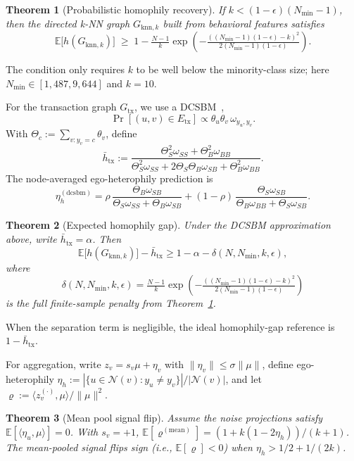 \documentclass[sigconf,natbib=true,anonymous=true]{acmart}
\newtheorem{theorem}{Theorem}
\theoremstyle{definition}
\begin{document}
\begin{theorem}[Probabilistic homophily recovery]
\label{thm:knn_homophily}
If $k < (1-\epsilon)(N_{\min}-1)$, then the directed k-NN graph $G_{\text{knn},k}$ built from behavioral features satisfies
\[
    \mathbb{E}\big[h(G_{\text{knn}, k})\big] \;\geq\; 1 - \tfrac{N - 1}{k} \exp\!\left(-\tfrac{((N_{\min}-1)(1-\epsilon) - k)^2}{2(N_{\min}-1)(1-\epsilon)}\right).
\]
\end{theorem}
\noindent The condition only requires $k$ to be well below the minority-class size; here $N_{\min}\in[1{,}487,9{,}644]$ and $k=10$.

For the transaction graph $G_{\text{tx}}$, we use a DCSBM~\cite{karrer2011stochastic},
\begin{equation}\label{eq:dcsbm}
    \Pr[(u, v) \in E_{\text{tx}}] \propto \theta_u\theta_v\,\omega_{y_u,y_v}.
\end{equation}
With $\Theta_c := \sum_{v:y_v=c}\theta_v$, define
\[
    \bar h_{\text{tx}}:=\frac{\Theta_S^2\omega_{SS}+\Theta_B^2\omega_{BB}}{\Theta_S^2\omega_{SS}+2\Theta_S\Theta_B\omega_{SB}+\Theta_B^2\omega_{BB}}.
\]
The node-averaged ego-heterophily prediction is
\begin{equation}\label{eq:eta_dcsbm}
\eta_h^{(\text{dcsbm})}=\rho\,\frac{\Theta_B\omega_{SB}}{\Theta_S\omega_{SS}+\Theta_B\omega_{SB}}+(1-\rho)\,\frac{\Theta_S\omega_{SB}}{\Theta_B\omega_{BB}+\Theta_S\omega_{SB}}.
\end{equation}

\begin{theorem}[Expected homophily gap]
\label{thm:combined}
Under the DCSBM approximation above, write $\bar h_{\text{tx}}=\alpha$. Then
\[
\mathbb{E}\big[h(G_{\text{knn}, k})\big] - \bar h_{\text{tx}} \geq 1 - \alpha - \delta(N, N_{\min}, k, \epsilon),
\]
where
\[
\delta(N,N_{\min},k,\epsilon)=\tfrac{N - 1}{k}\exp\!\left(-\tfrac{((N_{\min}-1)(1-\epsilon) - k)^2}{2(N_{\min}-1)(1-\epsilon)}\right)
\]
is the full finite-sample penalty from Theorem~\ref{thm:knn_homophily}.
\end{theorem}
\noindent When the separation term is negligible, the ideal homophily-gap reference is $1-\bar h_{\text{tx}}$.

For aggregation, write $z_v=s_v\mu+\eta_v$ with $\|\eta_v\|\le \sigma\|\mu\|$, define ego-heterophily $\eta_h := |\{u\in\mathcal{N}(v): y_u\neq y_v\}|/|\mathcal{N}(v)|$, and let $\varrho := \langle z_v^{(\cdot)}, \mu \rangle / \|\mu\|^2$.

\begin{theorem}[Mean pool signal flip]
\label{thm:meanpool}
Assume the noise projections satisfy $\mathbb{E}[\langle \eta_u,\mu\rangle]=0$. With $s_v=+1$, $\mathbb{E}[\varrho^{(\text{mean})}] = (1 + k(1 - 2\eta_h)) / (k+1)$. The mean-pooled signal flips sign (i.e., $\mathbb{E}[\varrho] < 0$) when $\eta_h > 1/2 + 1/(2k)$.
\end{theorem}
\end{document}
